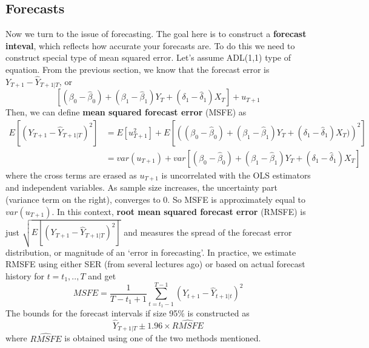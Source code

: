 \documentclass[12pt]{article}
\theoremstyle{definition}
\theoremstyle{property}
\theoremstyle{assumption}
\theoremstyle{example}
\theoremstyle{comment}
\begin{document}
\subsection{Forecasts}
Now we turn to the issue of forecasting. The goal here is to construct a \textbf{forecast inteval}, which reflects how accurate your forecasts are. To do this we need to construct special type of mean squared error. Let's assume ADL(1,1) type of equation.  From the previous section, we know that the forecast error is $Y_{T+1}-\hat{Y}_{T+1|T}$, or
\[
[(\beta_0-\hat{\beta}_0)+(\beta_1-\hat{\beta}_1)Y_{T}+(\delta_1-\hat{\delta}_1)X_T]+u_{T+1}
\] 
Then, we can define \textbf{mean squared forecast error} (MSFE) as
\[
\begin{aligned}
E[(Y_{T+1}-\hat{Y}_{T+1|T})^2]&=E[u_{T+1}^2]+E[\left((\beta_0-\hat{\beta}_0)+(\beta_1-\hat{\beta}_1)Y_{T}+(\delta_1-\hat{\delta}_1)X_T)\right)^2]\\
&=var(u_{T+1}) + var[(\beta_0-\hat{\beta}_0)+(\beta_1-\hat{\beta}_1)Y_{T}+(\delta_1-\hat{\delta}_1)X_T]
\end{aligned}
\]
where the cross terms are erased as $u_{T+1}$ is uncorrelated with the OLS estimators and independent variables. As sample size increases, the uncertainty part (variance term on the right), converges to 0. So MSFE is approximately equal to $var(u_{T+1})$. In this context, \textbf{root mean squared forecast error} (RMSFE) is just $\sqrt{E[(Y_{T+1}-\hat{Y}_{T+1|T})^2]}$ and measures the spread of the forecast error distribution, or magnitude of an `error in forecasting'. In practice, we estimate RMSFE using either SER (from several lectures ago) or based on actual forecast history for $t=t_1,..,T$ and get 
\[
MSFE = \frac{1}{T-t_1+1}\sum_{t=t_1-1}^{T-1}(Y_{t+1}-\hat{Y}_{t+1|t})^2
\]
The bounds for the forecast intervals if size 95\% is constructed as
\[
\hat{Y}_{T+1|T}\pm 1.96\times \widehat{RMSFE}
\]
where $\widehat{RMSFE}$ is obtained using one of the two methods mentioned. 
\end{document}
